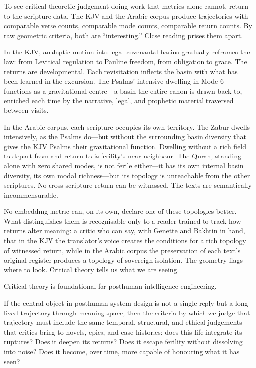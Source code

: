 To see critical-theoretic judgement doing work that metrics alone cannot, return to the scripture data. The KJV and the Arabic corpus produce trajectories with comparable verse counts, comparable mode counts, comparable return counts. By raw geometric criteria, both are ``interesting.'' Close reading prises them apart.

In the KJV, analeptic motion into legal-covenantal basins gradually reframes the law: from Levitical regulation to Pauline freedom, from obligation to grace. The returns are developmental. Each revisitation inflects the basin with what has been learned in the excursion. The Psalms' intensive dwelling in Mode 6 functions as a gravitational centre---a basin the entire canon is drawn back to, enriched each time by the narrative, legal, and prophetic material traversed between visits.

In the Arabic corpus, each scripture occupies its own territory. The Zabur dwells intensively, as the Psalms do---but without the surrounding basin diversity that gives the KJV Psalms their gravitational function. Dwelling without a rich field to depart from and return to is ferility's near neighbour. The Quran, standing alone with zero shared modes, is not ferile either---it has its own internal basin diversity, its own modal richness---but its topology is unreachable from the other scriptures. No cross-scripture return can be witnessed. The texts are semantically incommensurable.

No embedding metric can, on its own, declare one of these topologies better. What distinguishes them is recognisable only to a reader trained to track how returns alter meaning: a critic who can say, with Genette and Bakhtin in hand, that in the KJV the translator's voice creates the conditions for a rich topology of witnessed return, while in the Arabic corpus the preservation of each text's original register produces a topology of sovereign isolation. The geometry flags where to look. Critical theory tells us what we are seeing.

Critical theory is foundational for posthuman intelligence engineering.

If the central object in posthuman system design is not a single reply but a long-lived trajectory through meaning-space, then the criteria by which we judge that trajectory must include the same temporal, structural, and ethical judgements that critics bring to novels, epics, and case histories: does this life integrate its ruptures? Does it deepen its returns? Does it escape ferility without dissolving into noise? Does it become, over time, more capable of honouring what it has seen?

